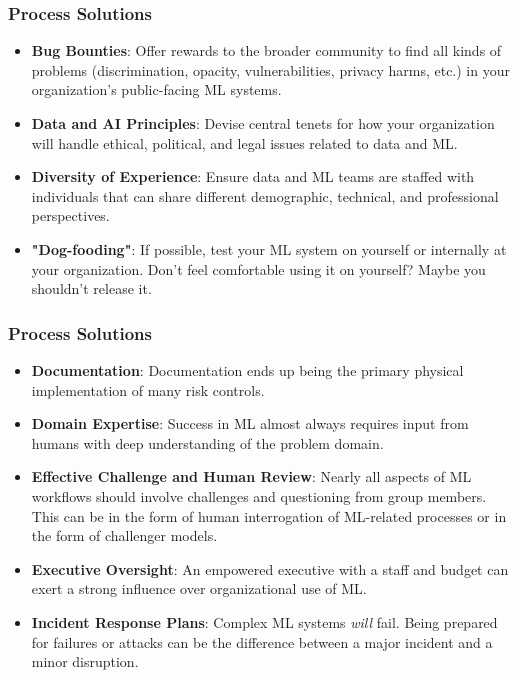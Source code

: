 \documentclass[11pt,
               aspectratio=169,
               hyperref={colorlinks}
               ]{beamer}
\begin{document}
		\begin{frame}
	
			\frametitle{Process Solutions}
			
			\begin{itemize}
				
				\item \textbf{Bug Bounties}: Offer rewards to the broader community to find all kinds of problems (discrimination, opacity, vulnerabilities, privacy harms, etc.) in your organization's public-facing ML systems. 
				
				\item \textbf{Data and AI Principles}: Devise central tenets for how your organization will handle ethical, political, and legal issues related to data and ML.
				
				\item \textbf{Diversity of Experience}: Ensure data and ML teams are staffed with individuals that can share different demographic, technical, and professional perspectives. 
				
				\item \textbf{"Dog-fooding"}: If possible, test your ML system on yourself or internally at your organization. Don't feel comfortable using it on yourself? Maybe you shouldn't release it. 
				
			\end{itemize}
					
		\end{frame}
		
		\begin{frame}
		
			\frametitle{Process Solutions}
			
			\begin{itemize}

				\item \textbf{Documentation}: Documentation ends up being the primary physical implementation of many risk controls. 

				\item \textbf{Domain Expertise}: Success in ML almost always requires input from humans with deep understanding of the problem domain. 
				
				\item \textbf{Effective Challenge and Human Review}: Nearly all aspects of ML workflows should involve challenges and questioning from group members. This can be in the form of human interrogation of ML-related processes or in the form of challenger models. 
				
				\item \textbf{Executive Oversight}: An empowered executive with a staff and budget can exert a strong influence over organizational use of ML.
				
				\item \textbf{Incident Response Plans}: Complex ML systems \textit{will} fail. Being prepared for failures or attacks can be the difference between a major incident and a minor disruption.
				
			\end{itemize}
			
		\end{frame}
		
\end{document}
